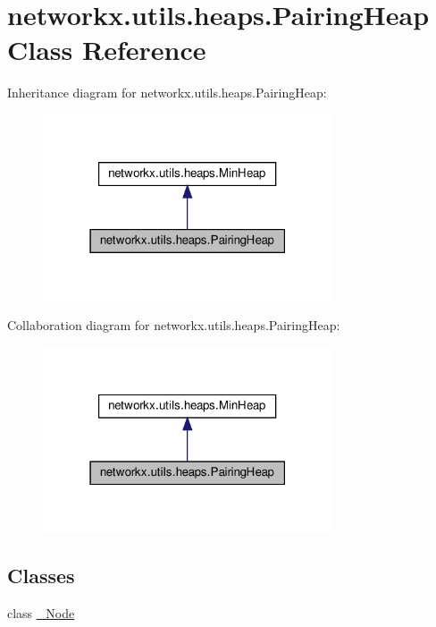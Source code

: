 \hypertarget{classnetworkx_1_1utils_1_1heaps_1_1PairingHeap}{}\section{networkx.\+utils.\+heaps.\+Pairing\+Heap Class Reference}
\label{classnetworkx_1_1utils_1_1heaps_1_1PairingHeap}


Inheritance diagram for networkx.\+utils.\+heaps.\+Pairing\+Heap\+:
\nopagebreak
\begin{figure}[H]
\begin{center}
\leavevmode
\includegraphics[width=243pt]{classnetworkx_1_1utils_1_1heaps_1_1PairingHeap__inherit__graph}
\end{center}
\end{figure}


Collaboration diagram for networkx.\+utils.\+heaps.\+Pairing\+Heap\+:
\nopagebreak
\begin{figure}[H]
\begin{center}
\leavevmode
\includegraphics[width=243pt]{classnetworkx_1_1utils_1_1heaps_1_1PairingHeap__coll__graph}
\end{center}
\end{figure}
\subsection*{Classes}
\begin{DoxyCompactItemize}
\item 
class \hyperlink{classnetworkx_1_1utils_1_1heaps_1_1PairingHeap_1_1__Node}{\+\_\+\+Node}
\end{DoxyCompactItemize}
